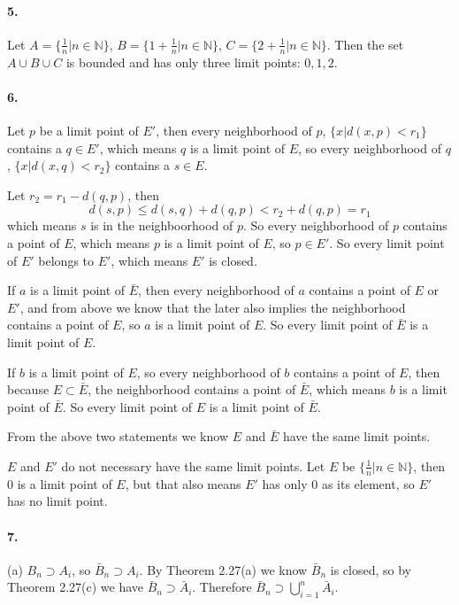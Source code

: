 \documentclass[a4paper]{article}
\begin{document}
\paragraph{5.}
Let $A=\{\frac{1}{n}|n\in\mathbb{N}\}$, $B=\{1+\frac{1}{n}|n\in\mathbb{N}\}$, $C=\{2+\frac{1}{n}|n\in\mathbb{N}\}$. Then the set $A\cup B\cup C$ is bounded and has only three limit points: $0,1,2$. 

\paragraph{6.}
Let $p$ be a limit point of $E'$, then every neighborhood of $p$, $\{x|d(x,p)<r_1\}$ contains a $q\in E'$, which means $q$ is a limit point of $E$, so every neighborhood of $q$, $\{x|d(x,q)<r_2\}$ contains a $s\in E$. 

Let $r_2=r_1-d(q,p)$, then 
\[
d(s,p)\leq d(s,q)+d(q,p)<r_2+d(q,p)=r_1
\]
which means $s$ is in the neighboorhood of $p$. So every neighborhood of $p$ contains a point of $E$, which means $p$ is a limit point of $E$, so $p\in E'$. So every limit point of $E'$ belongs to $E'$, which means $E'$ is closed.
\medskip

If $a$ is a limit point of $\bar{E}$, then every neighborhood of $a$ contains a point of $E$ or $E'$, and from above we know that the later also implies the neighborhood contains a point of $E$, so $a$ is a limit point of $E$. So every limit point of $\bar{E}$ is a limit point of $E$.

If $b$ is a limit point of $E$, so every neighborhood of $b$ contains a point of $E$, then because $E\subset\bar{E}$, the neighborhood contains a point of $\bar{E}$, which means $b$ is a limit point of $\bar{E}$. So every limit point of $E$ is a limit point of $\bar{E}$.

From the above two statements we know $E$ and $\bar{E}$ have the same limit points.
\medskip

$E$ and $E'$ do not necessary have the same limit points. Let $E$ be $\{\frac{1}{n}|n\in\mathbb{N}\}$, then $0$ is a limit point of $E$, but that also means $E'$ has only $0$ as its element, so $E'$ has no limit point.

\paragraph{7.}
(a) $B_n\supset A_i$, so $\bar{B}_n\supset A_i$. By Theorem 2.27(a) we know $\bar{B}_n$ is closed, so by Theorem 2.27(c) we have $\bar{B}_n\supset\bar{A}_i$. Therefore $\bar{B}_n\supset\bigcup_{i=1}^n\bar{A}_i$.
\end{document}
